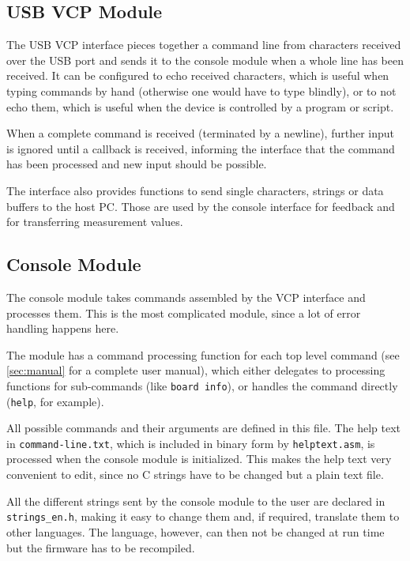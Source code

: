 \subsection{USB VCP Module}

The USB VCP interface pieces together a command line from characters received over the USB port and sends it to the
console module when a whole line has been received. It can be configured to echo received characters, which is useful
when typing commands by hand (otherwise one would have to type blindly), or to not echo them, which is useful when
the device is controlled by a program or script.

When a complete command is received (terminated by a newline), further input is ignored until a callback is received,
informing the interface that the command has been processed and new input should be possible.

The interface also provides functions to send single characters, strings or data buffers to the host PC.
Those are used by the console interface for feedback and for transferring measurement values.


\subsection{Console Module}

The console module takes commands assembled by the VCP interface and processes them. This is the most complicated
module, since a lot of error handling happens here.

The module has a command processing function for each top level command (see \autoref{sec:manual} for a complete
user manual), which either delegates to processing functions for sub-commands (like \texttt{board info}), or
handles the command directly (\texttt{help}, for example).

All possible commands and their arguments are defined in this file. The help text in \verb!command-line.txt!, which
is included in binary form by \verb!helptext.asm!, is processed when the console module is initialized. This makes
the help text very convenient to edit, since no C strings have to be changed but a plain text file.

All the different strings sent by the console module to the user are declared in \verb!strings_en.h!, making it easy
to change them and, if required, translate them to other languages. The language, however, can then not be changed
at run time but the firmware has to be recompiled.


